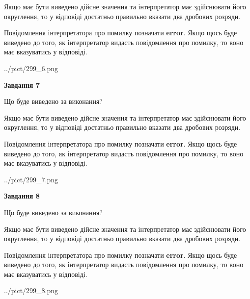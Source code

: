 \documentclass[12pt, ukrainian]{article}
\begin{document}
{\begin {Large}
Якщо має бути виведено дійсне значення та інтерпретатор має здійснювати його округлення, 
то у відповіді достатньо правильно вказати два дробових розряди.

Повідомлення інтерпретатора про помилку позначати \textbf{error}.
Якщо щось буде виведено до того, як інтерпретатор видасть повідомлення про помилку, 
то воно має вказуватись у відповіді. \par

\begin{center}
	{../pict/299_6.png}
\end{center}
\newpage

{\begin {center}\textbf{Завдання 7}\end {center}}\par
Що буде виведено за виконання? \par

Якщо має бути виведено дійсне значення та інтерпретатор має здійснювати його округлення, 
то у відповіді достатньо правильно вказати два дробових розряди.

Повідомлення інтерпретатора про помилку позначати \textbf{error}.
Якщо щось буде виведено до того, як інтерпретатор видасть повідомлення про помилку, 
то воно має вказуватись у відповіді. \par

\begin{center}
	{../pict/299_7.png}
\end{center}
\newpage

{\begin {center}\textbf{Завдання 8}\end {center}}\par
Що буде виведено за виконання? \par

Якщо має бути виведено дійсне значення та інтерпретатор має здійснювати його округлення, 
то у відповіді достатньо правильно вказати два дробових розряди.

Повідомлення інтерпретатора про помилку позначати \textbf{error}.
Якщо щось буде виведено до того, як інтерпретатор видасть повідомлення про помилку, 
то воно має вказуватись у відповіді. \par

\begin{center}
	{../pict/299_8.png}
\end{center}
\newpage


\end{Large}}
\end{document}
